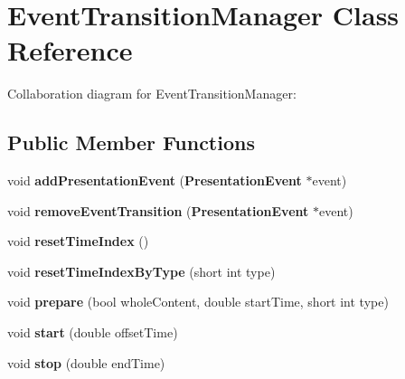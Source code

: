 \section{EventTransitionManager Class Reference}
\label{classbr_1_1pucrio_1_1telemidia_1_1ginga_1_1ncl_1_1model_1_1event_1_1transition_1_1EventTransitionManager}
Collaboration diagram for EventTransitionManager:\subsection*{Public Member Functions}
\begin{CompactItemize}
\item 
void \textbf{addPresentationEvent} ({\bf PresentationEvent} $\ast$event)\label{classbr_1_1pucrio_1_1telemidia_1_1ginga_1_1ncl_1_1model_1_1event_1_1transition_1_1EventTransitionManager_25867e0300ec8a2b4c60b2b6ee816620}

\item 
void \textbf{removeEventTransition} ({\bf PresentationEvent} $\ast$event)\label{classbr_1_1pucrio_1_1telemidia_1_1ginga_1_1ncl_1_1model_1_1event_1_1transition_1_1EventTransitionManager_232c9548270782f1ccc8f6f7d3c514f1}

\item 
void \textbf{resetTimeIndex} ()\label{classbr_1_1pucrio_1_1telemidia_1_1ginga_1_1ncl_1_1model_1_1event_1_1transition_1_1EventTransitionManager_f43463e115c91f9048d2123f6a1c2bdf}

\item 
void \textbf{resetTimeIndexByType} (short int type)\label{classbr_1_1pucrio_1_1telemidia_1_1ginga_1_1ncl_1_1model_1_1event_1_1transition_1_1EventTransitionManager_07c5fd478cfd093185f1a11f7d9963f0}

\item 
void \textbf{prepare} (bool wholeContent, double startTime, short int type)\label{classbr_1_1pucrio_1_1telemidia_1_1ginga_1_1ncl_1_1model_1_1event_1_1transition_1_1EventTransitionManager_043256c41bb3b88f7f3408a325f0d4a1}

\item 
void \textbf{start} (double offsetTime)\label{classbr_1_1pucrio_1_1telemidia_1_1ginga_1_1ncl_1_1model_1_1event_1_1transition_1_1EventTransitionManager_0c460d632cf29392f9ea6074c65bccdf}

\item 
void \textbf{stop} (double endTime)\label{classbr_1_1pucrio_1_1telemidia_1_1ginga_1_1ncl_1_1model_1_1event_1_1transition_1_1EventTransitionManager_0ef9f1d29765b6e5809c27f8021e27a7}


\end{CompactItemize}
